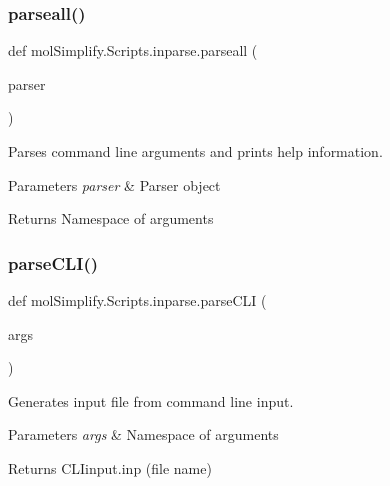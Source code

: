 \subsubsection{\texorpdfstring{parseall()}{parseall()}}
{\footnotesize\ttfamily def mol\+Simplify.\+Scripts.\+inparse.\+parseall (\begin{DoxyParamCaption}\item[{}]{parser }\end{DoxyParamCaption})}



Parses command line arguments and prints help information. 


\begin{DoxyParams}{Parameters}
{\em parser} & Parser object \\
\hline
\end{DoxyParams}
\begin{DoxyReturn}{Returns}
Namespace of arguments 
\end{DoxyReturn}
\mbox{\label{namespacemolSimplify_1_1Scripts_1_1inparse_a1237624836c2bd63dd4505c3fa9c6bd9}} 
\subsubsection{\texorpdfstring{parse\+C\+L\+I()}{parseCLI()}}
{\footnotesize\ttfamily def mol\+Simplify.\+Scripts.\+inparse.\+parse\+C\+LI (\begin{DoxyParamCaption}\item[{}]{args }\end{DoxyParamCaption})}



Generates input file from command line input. 


\begin{DoxyParams}{Parameters}
{\em args} & Namespace of arguments \\
\hline
\end{DoxyParams}
\begin{DoxyReturn}{Returns}
C\+L\+Iinput.\+inp (file name) 
\end{DoxyReturn}
\mbox{\label{namespacemolSimplify_1_1Scripts_1_1inparse_a785d102ca44ed15654769001303bfe36}} 
